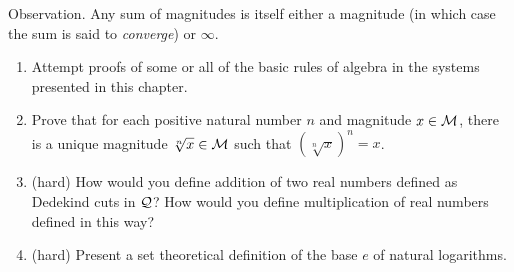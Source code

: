 \begin{ThmEtc}{Observation.}
 Any sum of magnitudes is itself either a magnitude
 (in which case the sum is said to {\itshape converge\/})  or $\infty$.
\end{ThmEtc}


\Exercises

\begin{enumerate}
\item  Attempt proofs of some or all of the basic rules of algebra in the
  systems presented in this chapter. 

\item  Prove that for each positive natural number $n$
  and magnitude $x \in {\cal M}$, there is a unique magnitude $\sqrt[n]{x}\in
  {\cal M}$ such that $(\sqrt[n]{x})^n = x$.

\item  (hard) How would you define addition of two real numbers defined as Dedekind cuts in $\cal Q$?  How would you define
  multiplication of real numbers defined
  in this way?

\item  (hard) Present a set theoretical definition of the base $e$ of natural
  logarithms.
\end{enumerate}
